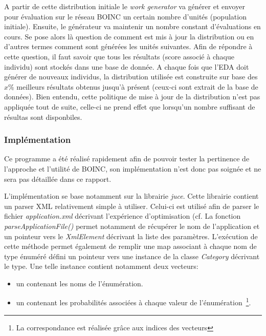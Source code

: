 \documentclass[a4paper, 11pt]{report}
\begin{document}
A partir de cette distribution initiale le \textit{work generator} va générer et envoyer pour évaluation sur le réseau \textsc{BOINC} un certain nombre d'unités (population initiale). Ensuite, le générateur va maintenir un nombre constant d'évaluations en cours. Se pose alors là question de comment est mis à jour la distribution ou en d'autres termes comment sont générées les unités suivantes. Afin de répondre à cette question, il faut savoir que tous les résultats (score associé à chaque individu) sont stockés dans une base de donnée. A chaque fois que l'EDA doit générer de nouveaux individus, la distribution utilisée est construite sur base des $x\%$ meilleurs résultats obtenus jusqu'à présent (ceux-ci sont extrait de la base de données). Bien entendu, cette politique de mise à jour de la distribution n'est pas appliquée tout de suite, celle-ci ne prend effet que lorsqu'un nombre suffisant de résultas sont disponbiles.

\subsubsection{Implémentation}
Ce programme a été réalisé rapidement afin de pouvoir tester la pertinence de l'approche et l'utilité de \textsc{BOINC}, son implémentation n'est donc pas soignée et ne sera pas détaillée dans ce rapport.

L'implémentation se base notamment sur la librairie \textit{juce}. Cette librairie contient un parser XML relativement simple à utiliser. Celui-ci est utilisé afin de parser le fichier \textit{application.xml} décrivant l'expérience d'optimisation (cf. %
La fonction \textit{parseApplicationFile()} permet notamment de récupérer le nom de l'application et un pointeur vers le \textit{XmlElement} décrivant la liste des paramètres. L'exécution de cette méthode permet également de remplir une map associant à chaque nom de type énuméré défini un pointeur vers une instance de la classe \textit{Category} décrivant le type. Une telle instance contient notamment deux vecteurs:
\begin{itemize}
\item un contenant les noms de l'énumération.
\item un contenant les probabilités associées à chaque valeur de l'énumération~\footnote{La correspondance est réalisée grâce aux indices des vecteurs}.
\end{itemize}
\end{document}
